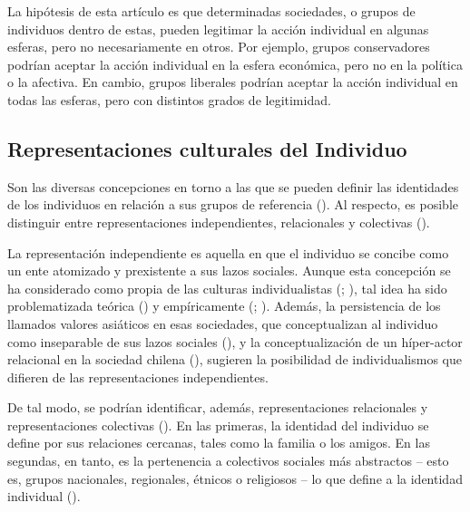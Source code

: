 \documentclass[
  12pt,
  letterpaper,
  DIV=11,
  numbers=noendperiod]{scrartcl}
\begin{document}
La hipótesis de esta artículo es que determinadas sociedades, o grupos
de individuos dentro de estas, pueden legitimar la acción individual en
algunas esferas, pero no necesariamente en otros. Por ejemplo, grupos
conservadores podrían aceptar la acción individual en la esfera
económica, pero no en la política o la afectiva. En cambio, grupos
liberales podrían aceptar la acción individual en todas las esferas,
pero con distintos grados de legitimidad.

\subsection{Representaciones culturales del
Individuo}\label{representaciones-culturales-del-individuo}

Son las diversas concepciones en torno a las que se pueden definir las
identidades de los individuos en relación a sus grupos de referencia
(). Al respecto, es
posible distinguir entre representaciones independientes, relacionales y
colectivas ().

La representación independiente es aquella en que el individuo se
concibe como un ente atomizado y prexistente a sus lazos sociales.
Aunque esta concepción se ha considerado como propia de las culturas
individualistas (;
), tal idea ha sido
problematizada teórica () y empíricamente (; ). Además,
la persistencia de los llamados valores asiáticos en esas sociedades,
que conceptualizan al individuo como inseparable de sus lazos sociales
(), y la conceptualización de un
híper-actor relacional en la sociedad chilena
(), sugieren la
posibilidad de individualismos que difieren de las representaciones
independientes.

De tal modo, se podrían identificar, además, representaciones
relacionales y representaciones colectivas
(). En las primeras, la
identidad del individuo se define por sus relaciones cercanas, tales
como la familia o los amigos. En las segundas, en tanto, es la
pertenencia a colectivos sociales más abstractos -- esto es, grupos
nacionales, regionales, étnicos o religiosos -- lo que define a la
identidad individual ().
\end{document}
